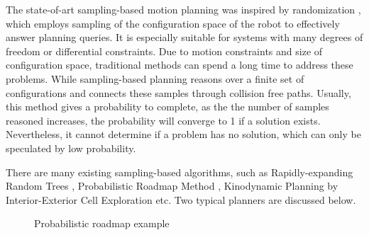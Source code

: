 The state-of-art sampling-based motion planning was inspired by randomization \citep{OMPLPrim20:online}, which employs sampling of the configuration space of the robot to effectively answer planning queries. It is especially suitable for systems with many degrees of freedom or differential constraints. Due to motion constraints and size of configuration space, traditional methods can spend a long time to address these problems. While sampling-based planning reasons over a finite set of configurations and connects these samples through collision free paths. Usually, this method gives a probability to complete, as the the number of samples reasoned increases, the probability will converge to 1 if a solution exists. Nevertheless, it cannot determine if a problem has no solution, which can only be speculated by low probability. 

There are many existing sampling-based algorithms, such as Rapidly-expanding Random Trees \citep{RRT}, Probabilistic Roadmap Method \citep{Kavraki1996ProbabilisticRF}, Kinodynamic Planning by Interior-Exterior Cell Exploration \citep{Sucan2012AST} etc. Two typical planners are discussed below.

\begin{figure}[H]
\centering
{}
\caption{Probabilistic roadmap example \citep{OMPLPrim20:online}}
\label{prm}
\end{figure}

